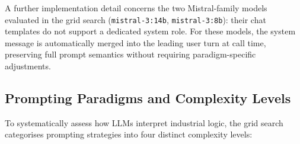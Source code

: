 ﻿\documentclass[11pt]{article}
\begin{document}
A further implementation detail concerns the two Mistral-family models evaluated
in the grid search (\texttt{mistral-3:14b}, \texttt{mistral-3:8b}): their chat
templates do not support a dedicated system role. For these models, the system
message is automatically merged into the leading user turn at call time, preserving
full prompt semantics without requiring paradigm-specific adjustments.

\subsection{Prompting Paradigms and Complexity Levels}
To systematically assess how LLMs interpret industrial logic, the grid search
categorises prompting strategies into four distinct complexity levels:
\end{document}
